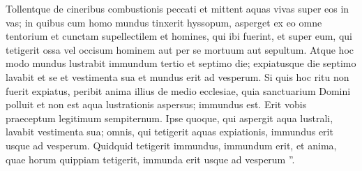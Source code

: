\begin{biblechapter}
\begin{biblechapter}
\begin{biblechapter}
\begin{biblechapter}
\begin{biblechapter}
\begin{biblechapter}
\begin{biblechapter}
\begin{biblechapter}
\begin{biblechapter}
\begin{biblechapter}
\begin{biblechapter}
\begin{biblechapter}
\begin{biblechapter}
\begin{biblechapter}
\begin{biblechapter}
\begin{biblechapter}
\begin{biblechapter}
\begin{biblechapter}
\begin{biblechapter}
\verse Tollentque de cineribus combustionis peccati et mittent aquas vivas super eos in vas; 
\verse in quibus cum homo mundus tinxerit hyssopum, asperget ex eo omne tentorium et cunctam supellectilem et homines, qui ibi fuerint, et super eum, qui tetigerit ossa vel occisum hominem aut per se mortuum aut sepultum. 
\verse Atque hoc modo mundus lustrabit immundum tertio et septimo die; expiatusque die septimo lavabit et se et vestimenta sua et mundus erit ad vesperum. 
\verse Si quis hoc ritu non fuerit expiatus, peribit anima illius de medio ecclesiae, quia sanctuarium Domini polluit et non est aqua lustrationis aspersus; immundus est. 
\verse Erit vobis praeceptum legitimum sempiternum. Ipse quoque, qui aspergit aqua lustrali, lavabit vestimenta sua; omnis, qui tetigerit aquas expiationis, immundus erit usque ad vesperum. 
\verse Quidquid tetigerit immundus, immundum erit, et anima, quae horum quippiam tetigerit, immunda erit usque ad vesperum ”.
 

\end{biblechapter}
\end{biblechapter}
\end{biblechapter}
\end{biblechapter}
\end{biblechapter}
\end{biblechapter}
\end{biblechapter}
\end{biblechapter}
\end{biblechapter}
\end{biblechapter}
\end{biblechapter}
\end{biblechapter}
\end{biblechapter}
\end{biblechapter}
\end{biblechapter}
\end{biblechapter}
\end{biblechapter}
\end{biblechapter}
\end{biblechapter}

